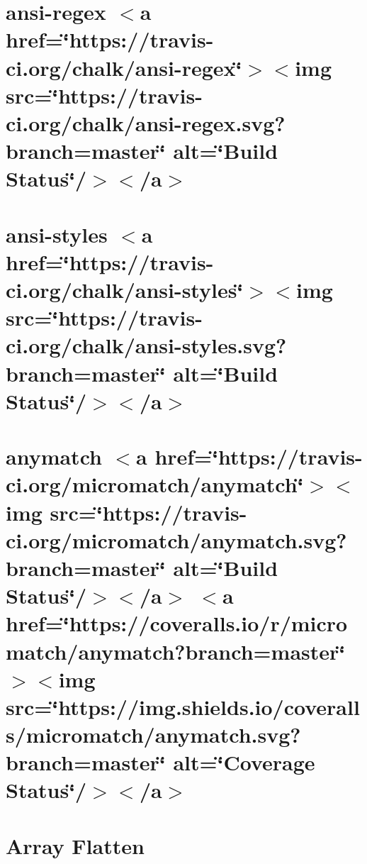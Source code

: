 \let\mypdfximage\pdfximage\def\pdfximage{\immediate\mypdfximage}\documentclass[twoside]{book}
\newcommand{\+}{\discretionary{\mbox{\scriptsize$\hookleftarrow$}}{}{}}
\begin{document}
\chapter{ansi-\/regex $<$a href=\char`\"{}https\+://travis-\/ci.\+org/chalk/ansi-\/regex\char`\"{}$>$$<$img src=\char`\"{}https\+://travis-\/ci.\+org/chalk/ansi-\/regex.\+svg?branch=master\char`\"{} alt=\char`\"{}\+Build Status\char`\"{}/$>$$<$/a$>$}
\label{md__c_1__git_hub__p_r_o_y_e_c_t_o-_i_i_i-_g_o_t_rest-api-node-mysql_node_modules_ansi-regex_readme}

\chapter{ansi-\/styles $<$a href=\char`\"{}https\+://travis-\/ci.\+org/chalk/ansi-\/styles\char`\"{}$>$$<$img src=\char`\"{}https\+://travis-\/ci.\+org/chalk/ansi-\/styles.\+svg?branch=master\char`\"{} alt=\char`\"{}\+Build Status\char`\"{}/$>$$<$/a$>$}
\label{md__c_1__git_hub__p_r_o_y_e_c_t_o-_i_i_i-_g_o_t_rest-api-node-mysql_node_modules_ansi-styles_readme}

\chapter{anymatch $<$a href=\char`\"{}https\+://travis-\/ci.\+org/micromatch/anymatch\char`\"{}$>$$<$img src=\char`\"{}https\+://travis-\/ci.\+org/micromatch/anymatch.\+svg?branch=master\char`\"{} alt=\char`\"{}\+Build Status\char`\"{}/$>$$<$/a$>$ $<$a href=\char`\"{}https\+://coveralls.\+io/r/micromatch/anymatch?branch=master\char`\"{}$>$$<$img src=\char`\"{}https\+://img.\+shields.\+io/coveralls/micromatch/anymatch.\+svg?branch=master\char`\"{} alt=\char`\"{}\+Coverage Status\char`\"{}/$>$$<$/a$>$}
\label{md__c_1__git_hub__p_r_o_y_e_c_t_o-_i_i_i-_g_o_t_rest-api-node-mysql_node_modules_anymatch__r_e_a_d_m_e}

\chapter{Array Flatten}
\label{md__c_1__git_hub__p_r_o_y_e_c_t_o-_i_i_i-_g_o_t_rest-api-node-mysql_node_modules_array-flatten__r_e_a_d_m_e}

\end{document}
